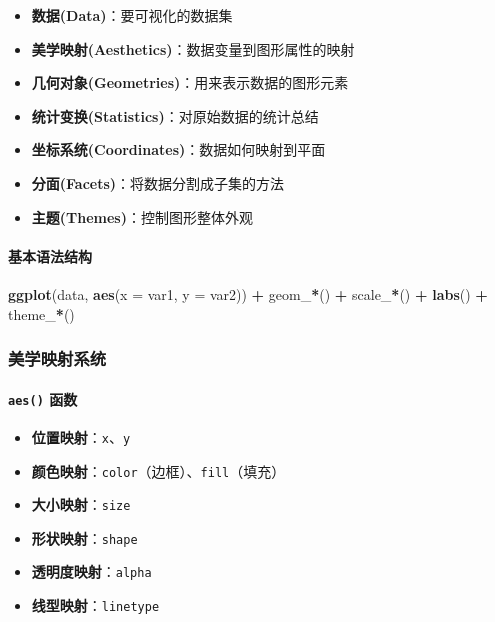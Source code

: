 \documentclass[
]{book}
\newenvironment{Shaded}{\begin{snugshade}}{\end{snugshade}}
\newcommand{\AttributeTok}[1]{\textcolor[rgb]{0.13,0.29,0.53}{#1}}
\newcommand{\FunctionTok}[1]{\textcolor[rgb]{0.13,0.29,0.53}{\textbf{#1}}}
\newcommand{\NormalTok}[1]{#1}
\newcommand{\SpecialCharTok}[1]{\textcolor[rgb]{0.81,0.36,0.00}{\textbf{#1}}}
\providecommand{\tightlist}{%
  \setlength{\itemsep}{0pt}\setlength{\parskip}{0pt}}
\begin{document}
\begin{itemize}
\tightlist
\item
  \textbf{数据(Data)}：要可视化的数据集
\item
  \textbf{美学映射(Aesthetics)}：数据变量到图形属性的映射
\item
  \textbf{几何对象(Geometries)}：用来表示数据的图形元素
\item
  \textbf{统计变换(Statistics)}：对原始数据的统计总结
\item
  \textbf{坐标系统(Coordinates)}：数据如何映射到平面
\item
  \textbf{分面(Facets)}：将数据分割成子集的方法
\item
  \textbf{主题(Themes)}：控制图形整体外观
\end{itemize}

\hypertarget{ux57faux672cux8bedux6cd5ux7ed3ux6784}{%
\paragraph{基本语法结构}\label{ux57faux672cux8bedux6cd5ux7ed3ux6784}}

\begin{Shaded}
\begin{Highlighting}[]
\FunctionTok{ggplot}\NormalTok{(data, }\FunctionTok{aes}\NormalTok{(}\AttributeTok{x =}\NormalTok{ var1, }\AttributeTok{y =}\NormalTok{ var2)) }\SpecialCharTok{+}
\NormalTok{  geom\_}\SpecialCharTok{*}\NormalTok{() }\SpecialCharTok{+}
\NormalTok{  scale\_}\SpecialCharTok{*}\NormalTok{() }\SpecialCharTok{+}
  \FunctionTok{labs}\NormalTok{() }\SpecialCharTok{+}
\NormalTok{  theme\_}\SpecialCharTok{*}\NormalTok{()}
\end{Highlighting}
\end{Shaded}

\hypertarget{ux7f8eux5b66ux6620ux5c04ux7cfbux7edf}{%
\subsubsection{美学映射系统}\label{ux7f8eux5b66ux6620ux5c04ux7cfbux7edf}}

\hypertarget{aes-ux51fdux6570}{%
\paragraph{\texorpdfstring{\texttt{aes()} 函数}{aes() 函数}}\label{aes-ux51fdux6570}}

\begin{itemize}
\tightlist
\item
  \textbf{位置映射}：\texttt{x}、\texttt{y}
\item
  \textbf{颜色映射}：\texttt{color}（边框）、\texttt{fill}（填充）
\item
  \textbf{大小映射}：\texttt{size}
\item
  \textbf{形状映射}：\texttt{shape}
\item
  \textbf{透明度映射}：\texttt{alpha}
\item
  \textbf{线型映射}：\texttt{linetype}
\end{itemize}
\end{document}
